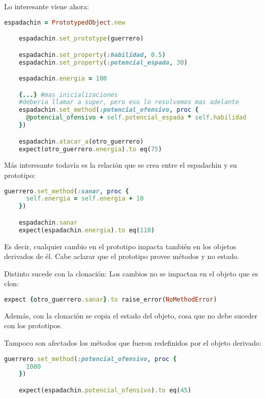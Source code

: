 \documentclass[spanish,a4paper]{article}
\begin{document}
\bigskip

Lo interesante viene ahora:
   \begin{lstlisting}[language=Ruby]
	espadachin = PrototypedObject.new

	espadachin.set_prototype(guerrero)

	espadachin.set_property(:habilidad, 0.5)
	espadachin.set_property(:potencial_espada, 30)

	espadachin.energia = 100

	{...} #mas inicializaciones
	#deberia llamar a super, pero eso lo resolvemos mas adelante
	espadachin.set_method(:potencial_ofensivo, proc {
	  @potencial_ofensivo + self.potencial_espada * self.habilidad
	})

	espadachin.atacar_a(otro_guerrero)
	expect(otro_guerrero.energia).to eq(75)
  \end{lstlisting}

Más interesante todavía es la relación que se crea entre el espadachin y su prototipo:
   \begin{lstlisting}[language=Ruby]
	guerrero.set_method(:sanar, proc {
	  self.energia = self.energia + 10                                
	})                                

	espadachin.sanar
	expect(espadachin.energia).to eq(110)
  \end{lstlisting}

Es decir, cualquier cambio en el prototipo impacta también en los objetos derivados de él. Cabe aclarar que el prototipo provee métodos y no estado.

\bigskip

Distinto sucede con la clonación: Los cambios no se impactan en el objeto que es clon:
\newpage
   \begin{lstlisting}[language=Ruby]
	expect {otro_guerrero.sanar}.to raise_error(NoMethodError)
  \end{lstlisting}
  Además, con la clonación se copia el estado del objeto, cosa que no debe suceder con los prototipos.

\bigskip

Tampoco son afectados los métodos que fueron redefinidos por el objeto derivado:
  
 \begin{lstlisting}[language=Ruby]
	guerrero.set_method(:potencial_ofensivo, proc {
	  1000
	})

	expect(espadachin.potencial_ofensivo).to eq(45)
  \end{lstlisting}
  
\end{document}
